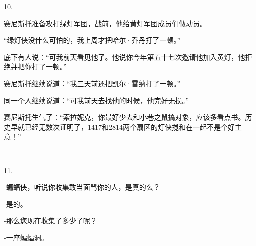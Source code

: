 10.

赛尼斯托准备攻打绿灯军团，战前，他给黄灯军团成员们做动员。

“绿灯侠没什么可怕的，我上周才把哈尔·乔丹打了一顿。”

底下有人说：“可我前天看见他了。他说你今年第五十七次邀请他加入黄灯，他拒绝并把你打了一顿。”

赛尼斯托继续说道：“我三天前还把凯尔·雷纳打了一顿。”

同一个人继续说道：“可我前天去找他的时候，他完好无损。”

赛尼斯托生气了：“索拉妮克，你最好少去和小巷之鼠搞对象，应该多看点书。历史早就已经无数次证明了，1417和2814两个扇区的灯侠搅和在一起不是个好主意！”

~\

11.

-蝙蝠侠，听说你收集敢当面骂你的人，是真的么？

-是的。

-那么您现在收集了多少了呢？

-一座蝙蝠洞。